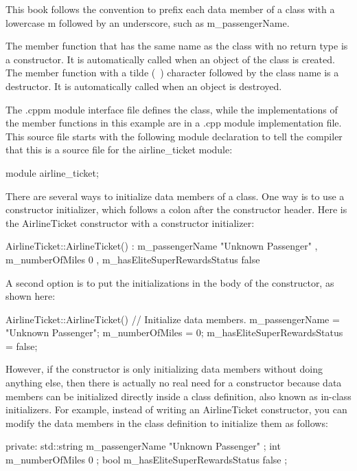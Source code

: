 This book follows the convention to prefix each data member of a class with a lowercase m followed by an underscore, such as m\_passengerName.

The member function that has the same name as the class with no return type is a constructor. It is automatically called when an object of the class is created. The member function with a tilde (~) character followed by the class name is a destructor. It is automatically called when an object is destroyed.

The .cppm module interface file defines the class, while the implementations of the member functions in this example are in a .cpp module implementation file. This source file starts with the following module declaration to tell the compiler that this is a source file for the airline\_ticket module:

\begin{cpp}
module airline_ticket;
\end{cpp}

There are several ways to initialize data members of a class. One way is to use a constructor initializer, which follows a colon after the constructor header. Here is the AirlineTicket constructor with a constructor initializer:

\begin{cpp}
AirlineTicket::AirlineTicket()
    : m_passengerName { "Unknown Passenger" }
    , m_numberOfMiles { 0 }
    , m_hasEliteSuperRewardsStatus { false }
{}
\end{cpp}

A second option is to put the initializations in the body of the constructor, as shown here:

\begin{cpp}
AirlineTicket::AirlineTicket()
{
    // Initialize data members.
    m_passengerName = "Unknown Passenger";
    m_numberOfMiles = 0;
    m_hasEliteSuperRewardsStatus = false;
}
\end{cpp}

However, if the constructor is only initializing data members without doing anything else, then there is actually no real need for a constructor because data members can be initialized directly inside a class definition, also known as in-class initializers. For example, instead of writing an AirlineTicket constructor, you can modify the data members in the class definition to initialize them as follows:

\begin{cpp}
private:
    std::string m_passengerName { "Unknown Passenger" };
    int m_numberOfMiles { 0 };
    bool m_hasEliteSuperRewardsStatus { false };
\end{cpp}

